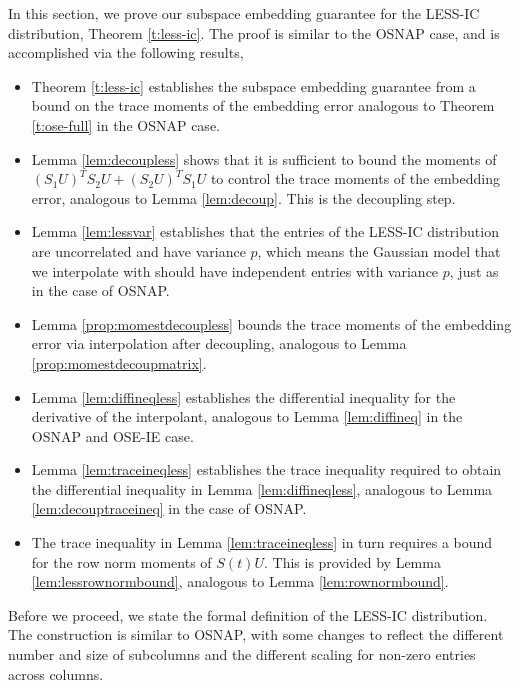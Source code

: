 \documentclass[11pt]{amsart}
\numberwithin{equation}{section}
\numberwithin{equation}{section}
\theoremstyle{remark}
\theoremstyle{definition}
\begin{document}
In this section, we prove our subspace embedding guarantee for the LESS-IC distribution, Theorem \ref{t:less-ic}. The proof is similar to the OSNAP case, and is accomplished via the following results,
\begin{itemize}
    \item Theorem \ref{t:less-ic} establishes the subspace embedding guarantee from a bound on the trace moments of the embedding error analogous to Theorem \ref{t:ose-full} in the OSNAP case.
    \item Lemma \ref{lem:decoupless} shows that it is sufficient to bound the moments of $(S_1U)^TS_2U + (S_2U)^TS_1U$ to control the trace moments of the embedding error, analogous to Lemma \ref{lem:decoup}. This is the decoupling step.
    \item Lemma \ref{lem:lessvar} establishes that the entries of the LESS-IC distribution are uncorrelated and have variance $p$, which means the Gaussian model that we interpolate with should have independent entries with variance $p$, just as in the case of OSNAP.
    \item Lemma \ref{prop:momestdecoupless} bounds the trace moments of the embedding error via interpolation after decoupling, analogous to Lemma \ref{prop:momestdecoupmatrix}.
    \item Lemma \ref{lem:diffineqless} establishes the differential inequality for the derivative of the interpolant, analogous to Lemma \ref{lem:diffineq} in the OSNAP and OSE-IE case.
    \item Lemma \ref{lem:traceineqless} establishes the trace inequality required to obtain the differential inequality in Lemma \ref{lem:diffineqless}, analogous to Lemma \ref{lem:decouptraceineq} in the case of OSNAP.
    \item The trace inequality in Lemma \ref{lem:traceineqless} in turn requires a bound for the row norm moments of $S(t)U$. This is provided by Lemma \ref{lem:lessrownormbound}, analogous to Lemma \ref{lem:rownormbound}.
\end{itemize}

Before we proceed, we state the formal definition of the LESS-IC distribution. The construction is similar to OSNAP, with some changes to reflect the different number and size of subcolumns and the different scaling for non-zero entries across columns.
\end{document}
